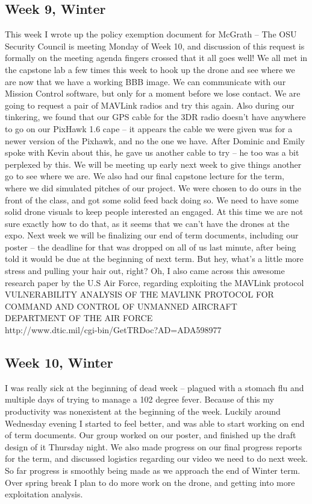 \documentclass[IEEEtran,letterpaper,10pt,notitlepage,draftclsnofoot,onecolumn]{article}
\begin{document}
\begin{sloppypar}
\subsection{Week 9, Winter}
This week I wrote up the policy exemption document for McGrath -- The OSU Security Council is meeting Monday of Week 10, and discussion of this request is formally on the meeting agenda fingers crossed that it all goes well!
We all met in the capstone lab a few times this week to hook up the drone and see where we are now that we have a working BBB image. We can communicate with our Mission Control software, but only for a moment before we lose contact. We are going to request a pair of MAVLink radios and try this again.
Also during our tinkering, we found that our GPS cable for the 3DR radio doesn't have anywhere to go on our PixHawk 1.6 cape -- it appears the cable we were given was for a newer version of the Pixhawk, and no the one we have. After Dominic and Emily spoke with Kevin about this, he gave us another cable to try -- he too was a bit perplexed by this. We will be meeting up early next week to give things another go to see where we are.
We also had our final capstone lecture for the term, where we did simulated pitches of our project. We were chosen to do ours in the front of the class, and got some solid feed back doing so. We need to have some solid drone visuals to keep people interested an engaged. At this time we are not sure exactly how to do that, as it seems that we can't have the drones at the expo.
Next week we will be finalizing our end of term documents, including our poster -- the deadline for that was dropped on all of us last minute, after being told it would be due at the beginning of next term. But hey, what's a little more stress and pulling your hair out, right?
Oh, I also came across this awesome research paper by the U.S Air Force, regarding exploiting the MAVLink protocol \\
VULNERABILITY ANALYSIS OF THE MAVLINK PROTOCOL FOR COMMAND AND CONTROL OF UNMANNED AIRCRAFT \\
DEPARTMENT OF THE AIR FORCE \\
http://www.dtic.mil/cgi-bin/GetTRDoc?AD=ADA598977 \\
\subsection{Week 10, Winter}
I was really sick at the beginning of dead week -- plagued with a stomach flu and multiple days of trying to manage a 102 degree fever. Because of this my productivity was nonexistent at the beginning of the week. Luckily around Wednesday evening I started to feel better, and was able to start working on end of term documents. Our group worked on our poster, and finished up the draft design of it Thursday night. We also made progress on our final progress reports for the term, and discussed logistics regarding our video we need to do next week. So far progress is smoothly being made as we approach the end of Winter term. Over spring break I plan to do more work on the drone, and getting into more exploitation analysis.

\end{sloppypar}
\end{document}
